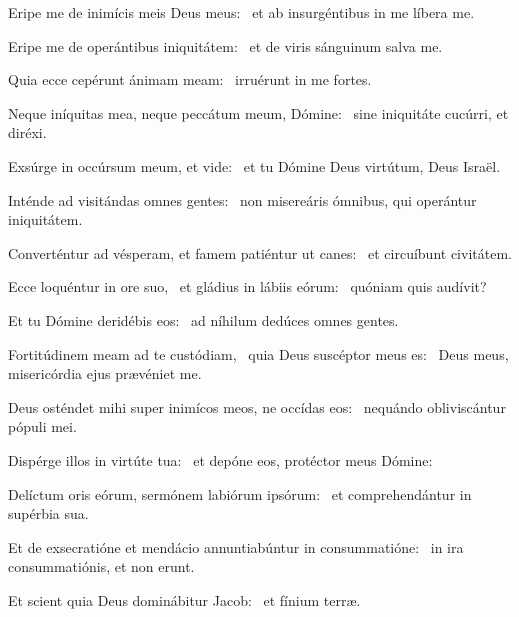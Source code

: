 \item Eripe me de inimícis meis Deus meus:~\psstar{} et ab insurgéntibus in me líbera me.

\item Eripe me de operántibus iniquitátem:~\psstar{} et de viris sánguinum salva me.

\item Quia ecce cepérunt ánimam meam:~\psstar{} irruérunt in me fortes.

\item Neque iníquitas mea, neque peccátum meum, Dómine:~\psstar{} sine iniquitáte cucúrri, et diréxi.

\item Exsúrge in occúrsum meum, et vide:~\psstar{} et tu Dómine Deus virtútum, Deus Israël.

\item Inténde ad visitándas omnes gentes:~\psstar{} non misereáris ómnibus, qui operántur iniquitátem.

\item Converténtur ad vésperam, et famem patiéntur ut canes:~\psstar{} et circuíbunt civitátem.

\item Ecce loquéntur in ore suo,~\pscross{} et gládius in lábiis eórum:~\psstar{} quóniam quis audívit?

\item Et tu Dómine deridébis eos:~\psstar{} ad níhilum dedúces omnes gentes.

\item Fortitúdinem meam ad te custódiam,~\pscross{} quia Deus suscéptor meus es:~\psstar{} Deus meus, misericórdia ejus prævéniet me.

\item Deus osténdet mihi super inimícos meos, ne occídas eos:~\psstar{} nequándo obliviscántur pópuli mei.

\item Dispérge illos in virtúte tua:~\psstar{} et depóne eos, protéctor meus Dómine:

\item Delíctum oris eórum, sermónem labiórum ipsórum:~\psstar{} et comprehendántur in supérbia sua.

\item Et de exsecratióne et mendácio annuntiabúntur in consummatióne:~\psstar{} in ira consummatiónis, et non erunt.

\item Et scient quia Deus dominábitur Jacob:~\psstar{} et fínium terræ.

